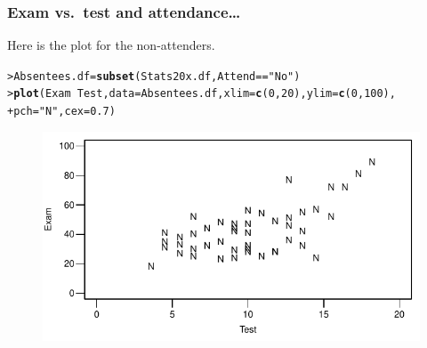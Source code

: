 \documentclass{beamer}\usepackage[]{graphicx}\usepackage[]{xcolor}
\makeatletter
\newcommand{\hlnum}[1]{\textcolor[rgb]{0.686,0.059,0.569}{#1}}%
\newcommand{\hlstr}[1]{\textcolor[rgb]{0.192,0.494,0.8}{#1}}%
\newcommand{\hlopt}[1]{\textcolor[rgb]{0,0,0}{#1}}%
\newcommand{\hlstd}[1]{\textcolor[rgb]{0.345,0.345,0.345}{#1}}%
\newcommand{\hlkwb}[1]{\textcolor[rgb]{0.69,0.353,0.396}{#1}}%
\newcommand{\hlkwc}[1]{\textcolor[rgb]{0.333,0.667,0.333}{#1}}%
\newcommand{\hlkwd}[1]{\textcolor[rgb]{0.737,0.353,0.396}{\textbf{#1}}}%
\newenvironment{kframe}{%
 \def\at@end@of@kframe{}%
 \ifinner\ifhmode%
  \def\at@end@of@kframe{\end{minipage}}%
  \begin{minipage}{\columnwidth}%
 \fi\fi%
 \def\FrameCommand##1{\hskip\@totalleftmargin \hskip-\fboxsep
 \colorbox{shadecolor}{##1}\hskip-\fboxsep
     \hskip-\linewidth \hskip-\@totalleftmargin \hskip\columnwidth}%
 \MakeFramed {\advance\hsize-\width
   \@totalleftmargin\z@ \linewidth\hsize
   \@setminipage}}%
 {\par\unskip\endMakeFramed%
 \at@end@of@kframe}
\newenvironment{knitrout}{}{} %
\makeatother
\begin{document}
\begin{frame}[fragile]
\frametitle{Exam vs.\ test \textbf{and} attendance\ldots}
Here is the plot for the non-attenders.

\begin{knitrout}\scriptsize
{}\color{fgcolor}\begin{kframe}
\begin{alltt}
\hlstd{> }\hlstd{Absentees.df} \hlkwb{=} \hlkwd{subset}\hlstd{(Stats20x.df, Attend} \hlopt{==} \hlstr{"No"}\hlstd{)}
\hlstd{> }\hlkwd{plot}\hlstd{(Exam} \hlopt{~} \hlstd{Test,} \hlkwc{data} \hlstd{= Absentees.df,} \hlkwc{xlim} \hlstd{=} \hlkwd{c}\hlstd{(}\hlnum{0}\hlstd{,} \hlnum{20}\hlstd{),} \hlkwc{ylim} \hlstd{=} \hlkwd{c}\hlstd{(}\hlnum{0}\hlstd{,} \hlnum{100}\hlstd{),}
\hlstd{+ }     \hlkwc{pch} \hlstd{=} \hlstr{"N"}\hlstd{,} \hlkwc{cex} \hlstd{=} \hlnum{0.7}\hlstd{)}
\end{alltt}
\end{kframe}
\end{knitrout}




\begin{figure}
  \centering
  \includegraphics{figure/RC-H08-006}
\end{figure}

\end{frame}
\end{document}
